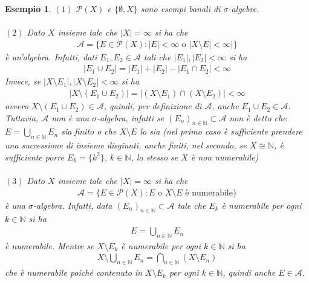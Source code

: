 \documentclass[oneside, 11pt]{amsbook}
\newcommand{\0}{{(0)}}
\newcommand{\3}{{(3)}}
\theoremstyle{colonplain}
\theoremstyle{colondefinition}
\newtheorem{ex}[thm]{Esempio}
\theoremstyle{colonremark}
\numberwithin{equation}{chapter}
\begin{document}
\begin{ex}
$(1)$ $\mathcal{P}(X)$ e $\{\emptyset, X\}$ sono esempi banali di $\sigma$-algebre. \\ \\
$(2)$ Dato $X$ insieme tale che $|X| = \infty$ si ha che
\begin{align}
    \mathcal{A} = \{E \in \mathcal{P}(X) : |E| < \infty \text{ o } |X \setminus E| < \infty|\}
\end{align}
è un'algebra. Infatti, dati $E_1, E_2 \in \mathcal{A}$ tali che $|E_1|, |E_2| < \infty$ si ha
\begin{align}
    |E_1 \cup E_2| = |E_1| + |E_2| - |E_1 \cap E_2| < \infty
\end{align}
Invece, se $|X \setminus E_1|, |X \setminus E_2| < \infty$ si ha
\begin{align}
    |X \setminus (E_1 \cup E_2)| = |(X \setminus E_1) \cap (X \setminus E_2)| < \infty
\end{align}
ovvero $X \setminus (E_1 \cup E_2) \in \mathcal{A}$, quindi, per definizione di $\mathcal{A}$, anche $E_1 \cup E_2 \in \mathcal{A}$. \\
Tuttavia, $\mathcal{A}$ non è una $\sigma$-algebra, infatti se $(E_n)_{n \in \mathbb{N}} \subset \mathcal{A}$ non è detto che $E = \bigcup_{n \in \mathbb{N}} E_n$ sia finito o che $X \setminus E$ lo sia (nel primo caso è sufficiente prendere una successione di insieme disgiunti, anche finiti, nel secondo, se $X \cong \mathbb{N}$, è sufficiente porre $E_k = \{k^2\}$, $k \in \mathbb{N}$, lo stesso se $X$ è non numerabile) \\ \\
$(3)$ Dato $X$ insieme tale che $|X| = \infty$ si ha che
\begin{align}
    \mathcal{A} = \{E \in \mathcal{P}(X) : E \text{ o } X \setminus E \text{ è numerabile}\}
\end{align}
è una $\sigma$-algebra. Infatti, data $(E_n)_{n \in \mathbb{N}} \subset \mathcal{A}$ tale che $E_k$ è numerabile per ogni $k \in \mathbb{N}$ si ha
\begin{align}
    E = \bigcup_{n \in \mathbb{N}} E_n
\end{align}
è numerabile. Mentre se $X \setminus E_k$ è numerabile per ogni $k \in \mathbb{N}$ si ha
\begin{align}
    X \setminus \bigcup_{n \in \mathbb{N}} E_n = \bigcap_{n \in \mathbb{N}} (X \setminus E_n)
\end{align}
che è numerabile poiché contenuto in $X \setminus E_k$ per ogni $k \in \mathbb{N}$, quindi anche $E \in \mathcal{A}$. \\ \\

\end{ex}
\end{document}
